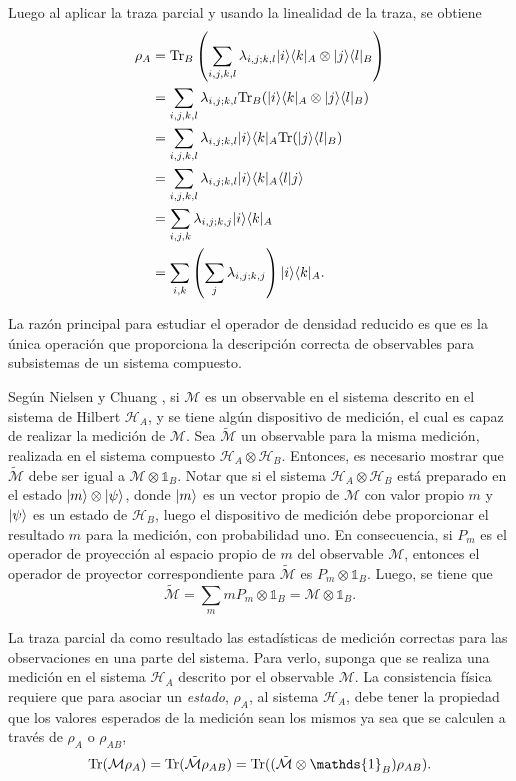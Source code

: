 Luego al aplicar la traza parcial y usando la linealidad de la traza, se obtiene 
\begin{equation}
	\begin{split}
		\rho_A&={\rm Tr}_B\left(\sum_{i,j,k,l}\lambda_{i,j;k,l} |i\rangle \langle k|_A\otimes|j\rangle \langle l|_B\right)\\
		&=\sum_{i,j,k,l}\lambda_{i,j;k,l} {\rm Tr}_B(|i\rangle \langle k|_A\otimes|j\rangle \langle l|_B)\\
		&=\sum_{i,j,k,l}\lambda_{i,j;k,l}|i\rangle \langle k|_A {\rm Tr}(|j\rangle \langle l|_B)\\
		&=\sum_{i,j,k,l}\lambda_{i,j;k,l}|i\rangle \langle k|_A \langle l|j\rangle \\
		&=\sum_{i,j,k}\lambda_{i,j;k,j}|i\rangle \langle k|_A\\
		&=\sum_{i,k}\left(\sum_j\lambda_{i,j;k,j}\right)|i\rangle \langle k|_A.
	\end{split}
\end{equation}

La razón principal para estudiar el operador de densidad reducido es que es la única operación que proporciona la descripción correcta de observables para subsistemas de un sistema compuesto. 

Según Nielsen y Chuang {\cite{nielsen_chuang_2010}}, si  $\mathcal{M}$ es un observable en el sistema descrito en el sistema de Hilbert $\mathcal{H}_A$, y se tiene algún dispositivo de medición, el cual es capaz de realizar la medición de $\mathcal{M}$. Sea $\tilde{\mathcal{M}}$ un observable para la misma medición, realizada en el sistema compuesto $\mathcal{H}_A\otimes \mathcal{H}_B$. Entonces, es necesario mostrar que $\tilde{\mathcal{M}}$ debe ser igual a $\mathcal{M}\otimes \mathds{1}_B$. Notar que si el sistema $\mathcal{H}_A\otimes \mathcal{H}_B$ está preparado en el estado $|m \rangle \otimes|\psi\rangle $, donde $|m\rangle $ es un vector propio de $\mathcal{M}$ con valor propio $m$ y $|\psi\rangle$ es un estado de $\mathcal{H}_B$, luego el dispositivo de medición debe proporcionar  el resultado $m$ para la medición, con probabilidad uno. En consecuencia, si $P_m$ es el operador de proyección al espacio propio de $m$ del observable $\mathcal{M}$, entonces el operador de proyector correspondiente para $\tilde{\mathcal{M}}$ es $P_m\otimes \mathds{1}_B$. Luego, se tiene que \[\mathcal{\tilde{M}}=\sum_m mP_m\otimes \mathds{1}_B=\mathcal{M}\otimes \mathds{1}_B.\]

La traza parcial da como resultado las estadísticas de medición correctas para las observaciones en una parte del sistema. Para verlo, suponga que se realiza una medición en el sistema $\mathcal{H}_A$ descrito por el observable $\mathcal{M}$. La consistencia física requiere que  para asociar un \textit{estado}, $\rho_A$, al sistema $\mathcal{H}_A$, debe tener la propiedad que los valores esperados de la medición sean los mismos ya sea que se calculen a través de $\rho_A$ o $\rho_{AB}$, {\cite{nielsen_chuang_2010}} \begin{equation}\label{promedioDeMedicion}\tr(\mathcal{M}\rho_A)=\tr(\mathcal{\tilde{M}}\rho_{AB})=\tr((\mathcal{\tilde{M}}\otimes \mathds{1}_B)\rho_{AB}).\end{equation} 

